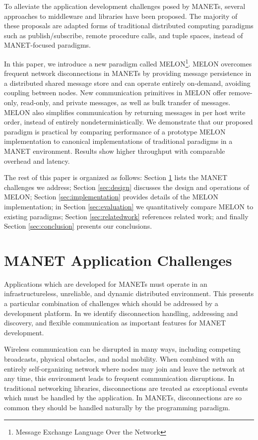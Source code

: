 \documentclass[lnicst]{svmultln}
\begin{document}
To alleviate the application development challenges posed by MANETs, several approaches to middleware and libraries have been proposed. The majority of these proposals are adapted forms of traditional distributed computing paradigms such as publish/subscribe\cite{psfaces}, remote procedure calls\cite{rpc}, and tuple spaces\cite{linda}, instead of MANET-focused paradigms.

In this paper, we introduce a new paradigm called MELON\footnote{Message Exchange Language Over the Network}. MELON overcomes frequent network disconnections in MANETs by providing message persistence in a distributed shared message store and can operate entirely on-demand, avoiding coupling between nodes. New communication primitives in MELON offer remove-only, read-only, and private messages, as well as bulk transfer of messages. MELON also simplifies communication by returning messages in per host write order, instead of entirely nondeterministically. We demonstrate that our proposed paradigm is practical by comparing performance of a prototype MELON implementation to canonical implementations of traditional paradigms in a MANET environment. Results show higher throughput with comparable overhead and latency.

The rest of this paper is organized as follows: Section \ref{sec:challenges} lists the MANET challenges we address; Section \ref{sec:design} discusses the design and operations of MELON; Section \ref{sec:implementation} provides details of the MELON implementation; in Section \ref{sec:evaluation} we quantitatively compare MELON to existing paradigms; Section \ref{sec:relatedwork} references related work; and finally Section \ref{sec:conclusion} presents our conclusions.

\section{MANET Application Challenges}\label{sec:challenges}

Applications which are developed for MANETs must operate in an infrastructureless, unreliable, and dynamic distributed environment. This presents a particular combination of challenges which should be addressed by a development platform. In \cite{mine} we identify disconnection handling, addressing and discovery, and flexible communication as important features for MANET development.

Wireless communication can be disrupted in many ways, including competing broadcasts, physical obstacles, and nodal mobility. When combined with an entirely self-organizing network where nodes may join and leave the network at any time, this environment leads to frequent communication disruptions. In traditional networking libraries, disconnections are treated as exceptional events which must be handled by the application. In MANETs, disconnections are so common they should be handled naturally by the programming paradigm.
\end{document}

